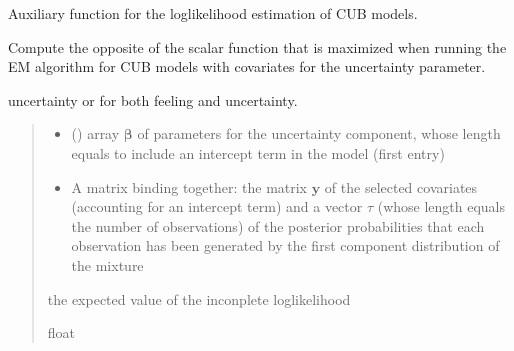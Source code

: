 \documentclass[letterpaper,10pt,english]{sphinxmanual}
\begin{document}
\begin{fulllineitems}
\label{\detokenize{cubmods:cubmods.cub_y0.effe10}}
\pysigstartsignatures
{}
\pysigstopsignatures
\sphinxAtStartPar
Auxiliary function for the log\sphinxhyphen{}likelihood estimation of CUB models.

\sphinxAtStartPar
Compute the opposite of the scalar function that is maximized when running
the E\sphinxhyphen{}M algorithm for CUB models with covariates for the uncertainty parameter.
\begin{description}
\sphinxAtStartPar
uncertainty or for both feeling and uncertainty.

\end{description}
\begin{quote}\begin{description}
\begin{itemize}
\item {} 
\sphinxAtStartPar
{} () \textendash{} array \(\pmb \beta\) of parameters for the uncertainty component, whose length equals 
 to include an intercept term in the model (first entry)

\item {} 
\sphinxAtStartPar
{} \textendash{} A matrix binding together: the matrix \(\pmb y\) of the selected covariates  
(accounting for an intercept term) and a vector \(\tau\) (whose length equals the number of observations) 
of the posterior probabilities that each observation has been generated by the first component 
distribution of the mixture

\end{itemize}

\sphinxAtStartPar
the expected value of the inconplete log\sphinxhyphen{}likelihood

\sphinxAtStartPar
float

\end{description}\end{quote}

\end{fulllineitems}
\end{document}
